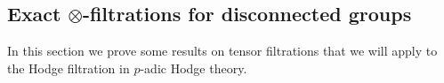 \documentclass{amsart}
\def\Ad{\mathrm{Ad}}
\def\ad{\mathrm{ad}}
\newtheorem{cor}[subsubsection]{Corollary}
\theoremstyle{definition}
\theoremstyle{remark}
\newcommand{\mar}[1]{}
\newcommand{\mar}[1]{\marginpar{\raggedright\tiny squirrel #1}}
\DeclareMathOperator{\Gal}{Gal}
\newcommand{\Res}{\operatorname{Res}}
\begin{document}


\subsection{Exact $\otimes$-filtrations for disconnected
  groups}%
In this section we prove some results on tensor filtrations that we
will apply to the Hodge filtration in $p$-adic Hodge theory.
\end{document}
